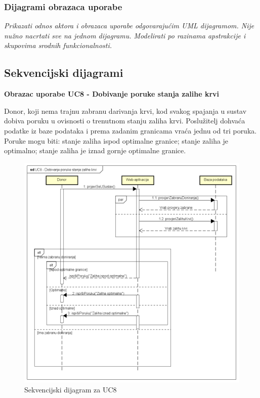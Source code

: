 \documentclass[11pt]{book}
\begin{document}
\subsubsection{Dijagrami obrazaca uporabe}

\textit{Prikazati odnos aktora i obrazaca uporabe odgovarajućim UML dijagramom. Nije nužno nacrtati sve na jednom dijagramu. Modelirati po razinama apstrakcije i skupovima srodnih funkcionalnosti.}
\eject		

\subsection{Sekvencijski dijagrami}

\textbf{Obrazac uporabe UC8 - Dobivanje poruke stanja zalihe krvi}

Donor, koji nema trajnu zabranu darivanja krvi, kod svakog spajanja u sustav dobiva poruku u ovisnosti o trenutnom stanju zaliha krvi. Poslužitelj dohvaća podatke iz baze podataka i prema zadanim granicama vraća jednu od tri poruka. Poruke mogu biti: stanje zaliha ispod optimalne granice; stanje zaliha je optimalno; stanje zaliha je iznad gornje optimalne granice.

\begin{figure}[h]
	\centering
	\includegraphics[width=\textwidth]{UC8 - Dobivanje poruke stanja zalihe krvi}
	\caption{Sekvencijski dijagram za UC8}
\end{figure}
\eject
\end{document}
